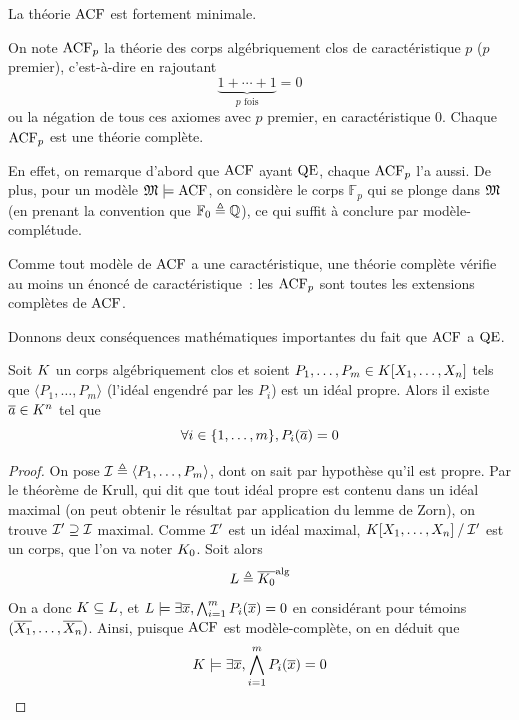 \begin{corollary}
  La théorie $\operatorname{ACF}$ est fortement minimale.
\end{corollary}

\begin{remark}
  On note $\operatorname{ACF}_p$ la théorie des corps algébriquement clos de caractéristique
  $p$ ($p$ premier), c'est-à-dire en rajoutant
  \[\underbrace{1+\cdots+1}_{p\text{ fois}} = 0\]
  ou la négation de tous ces axiomes avec $p$ premier, en caractéristique $0$.
  Chaque $\operatorname{ACF}_p$ est une théorie complète.

  En effet, on remarque d'abord que $\operatorname{ACF}$ ayant $\operatorname{QE}$, chaque $\operatorname{ACF}_p$ l'a
  aussi. De plus, pour un modèle $\mathfrak{M}\models\operatorname{ACF}$, on considère le corps
  $\mathbb{F}_p$ qui se plonge dans $\mathfrak{M}$ (en prenant la convention que
  $\mathbb{F}_0 \triangleq \mathbb Q$), ce qui suffit à conclure par modèle-complétude.

  Comme tout modèle de $\operatorname{ACF}$ a une caractéristique, une théorie complète
  vérifie au moins un énoncé de caractéristique~: les $\operatorname{ACF}_p$ sont toutes les
  extensions complètes de $\operatorname{ACF}$.
\end{remark}

\noindent
Donnons deux conséquences mathématiques importantes du fait que $\operatorname{ACF}$ a $\operatorname{QE}$.

\begin{corollary}
  Soit $K$ un corps algébriquement clos et soient
  $P_1,\ldots,P_m\in K[X_1,\ldots,X_n]$ tels que
  $\langle P_1,\ldots,P_m\rangle$ (l'idéal engendré par les $P_i$) est un
  idéal propre. Alors il existe $\overline{a} \in K^n$ tel que
  \[\forall i \in\{1,\ldots,m\}, P_i(\overline{a}) = 0\]
\end{corollary}

\begin{proof}
  On pose $\mathcal{I}\triangleq\langle P_1,\ldots,P_m\rangle$, dont on sait par
  hypothèse qu'il est propre. Par le théorème de Krull, qui dit que tout idéal
  propre est contenu dans un idéal maximal (on peut obtenir le résultat par
  application du lemme de Zorn), on trouve $\mathcal{I}'\supseteq\mathcal{I}$ maximal.
  Comme $\mathcal{I}'$ est un idéal maximal,
  $\mathord{K[X_1,\ldots,X_n]}\mathbin{/}\mathord{\mathcal{I}'}$ est un corps, que l'on va noter
  $K_0$. Soit alors
  \[L\triangleq \overline{K_0}^{\mathrm{alg}}\]
  On a donc $K\subseteq L$, et
  $L\models\exists \overline{x},\bigwedge_{i = 1}^{m} P_i(\overline{x}) = 0$
  en considérant pour témoins $(\overline{X_1},\ldots,\overline{X_n})$. Ainsi, puisque
  $\operatorname{ACF}$ est modèle-complète, on en déduit que
  \[K\models\exists \overline{x}, \bigwedge_{i = 1}^{m} P_i(\overline{x}) = 0\qedhere\]
\end{proof}


